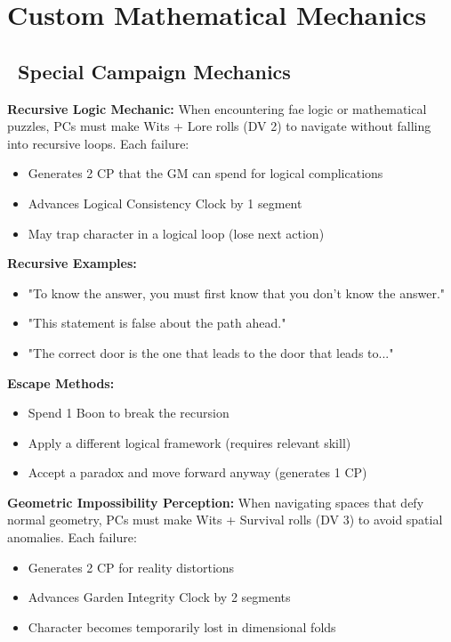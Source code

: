 \documentclass[11pt]{article}
\begin{document}
\section{Custom Mathematical Mechanics}

\subsection*{\faSquareRootAlt\ Special Campaign Mechanics}

\textbf{Recursive Logic Mechanic:}
When encountering fae logic or mathematical puzzles, PCs must make Wits + Lore rolls (DV 2) to navigate without falling into recursive loops. Each failure:
\begin{itemize}
    \item Generates 2 CP that the GM can spend for logical complications
    \item Advances Logical Consistency Clock by 1 segment
    \item May trap character in a logical loop (lose next action)
\end{itemize}

\textbf{Recursive Examples:}
\begin{itemize}
    \item "To know the answer, you must first know that you don't know the answer."
    \item "This statement is false about the path ahead."
    \item "The correct door is the one that leads to the door that leads to..."
\end{itemize}

\textbf{Escape Methods:}
\begin{itemize}
    \item Spend 1 Boon to break the recursion
    \item Apply a different logical framework (requires relevant skill)
    \item Accept a paradox and move forward anyway (generates 1 CP)
\end{itemize}

\textbf{Geometric Impossibility Perception:}
When navigating spaces that defy normal geometry, PCs must make Wits + Survival rolls (DV 3) to avoid spatial anomalies. Each failure:
\begin{itemize}
    \item Generates 2 CP for reality distortions
    \item Advances Garden Integrity Clock by 2 segments
    \item Character becomes temporarily lost in dimensional folds
\end{itemize}
\end{document}
